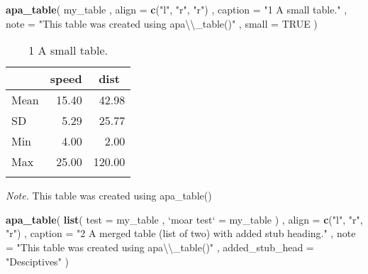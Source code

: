 \documentclass[english,man]{apa6}
\newenvironment{Shaded}{\begin{snugshade}}{\end{snugshade}}
\newcommand{\KeywordTok}[1]{\textcolor[rgb]{0.13,0.29,0.53}{\textbf{{#1}}}}
\newcommand{\DataTypeTok}[1]{\textcolor[rgb]{0.13,0.29,0.53}{{#1}}}
\newcommand{\CharTok}[1]{\textcolor[rgb]{0.31,0.60,0.02}{{#1}}}
\newcommand{\StringTok}[1]{\textcolor[rgb]{0.31,0.60,0.02}{{#1}}}
\newcommand{\OtherTok}[1]{\textcolor[rgb]{0.56,0.35,0.01}{{#1}}}
\newcommand{\NormalTok}[1]{{#1}}
\theoremstyle{definition}
\theoremstyle{definition}
\theoremstyle{definition}
\theoremstyle{remark}
\begin{document}
\begin{Shaded}
\begin{Highlighting}[]
\KeywordTok{apa_table}\NormalTok{(}
  \NormalTok{my_table}
  \NormalTok{, }\DataTypeTok{align =} \KeywordTok{c}\NormalTok{(}\StringTok{"l"}\NormalTok{, }\StringTok{"r"}\NormalTok{, }\StringTok{"r"}\NormalTok{)}
  \NormalTok{, }\DataTypeTok{caption =} \StringTok{"1 A small table."}
  \NormalTok{, }\DataTypeTok{note =} \StringTok{"This table was created using apa}\CharTok{\textbackslash{}\textbackslash{}}\StringTok{_table()"}
  \NormalTok{, }\DataTypeTok{small =} \OtherTok{TRUE}
\NormalTok{)}
\end{Highlighting}
\end{Shaded}

\begin{table}[tbp]
\begin{center}
\begin{threeparttable}
\caption{\label{tab:unnamed-chunk-2}1 A small table.}
\small{
\begin{tabular}{lrr}
\toprule
 & \multicolumn{1}{c}{speed} & \multicolumn{1}{c}{dist}\\
\midrule
Mean & 15.40 & 42.98\\
SD & 5.29 & 25.77\\
Min & 4.00 & 2.00\\
Max & 25.00 & 120.00\\
\bottomrule
\addlinespace
\end{tabular}
}
\begin{tablenotes}[para]
\textit{Note.} This table was created using apa\_table()
\end{tablenotes}
\end{threeparttable}
\end{center}
\end{table}

\begin{Shaded}
\begin{Highlighting}[]
\KeywordTok{apa_table}\NormalTok{(}
  \KeywordTok{list}\NormalTok{(}
    \DataTypeTok{test =} \NormalTok{my_table}
    \NormalTok{, }\StringTok{`}\DataTypeTok{moar test}\StringTok{`} \NormalTok{=}\StringTok{ }\NormalTok{my_table}
  \NormalTok{)}
  \NormalTok{, }\DataTypeTok{align =} \KeywordTok{c}\NormalTok{(}\StringTok{"l"}\NormalTok{, }\StringTok{"r"}\NormalTok{, }\StringTok{"r"}\NormalTok{)}
  \NormalTok{, }\DataTypeTok{caption =} \StringTok{"2 A merged table (list of two) with added stub heading."}
  \NormalTok{, }\DataTypeTok{note =} \StringTok{"This table was created using apa}\CharTok{\textbackslash{}\textbackslash{}}\StringTok{_table()"}
  \NormalTok{, }\DataTypeTok{added_stub_head =} \StringTok{"Desciptives"}
\NormalTok{)}
\end{Highlighting}
\end{Shaded}
\end{document}
